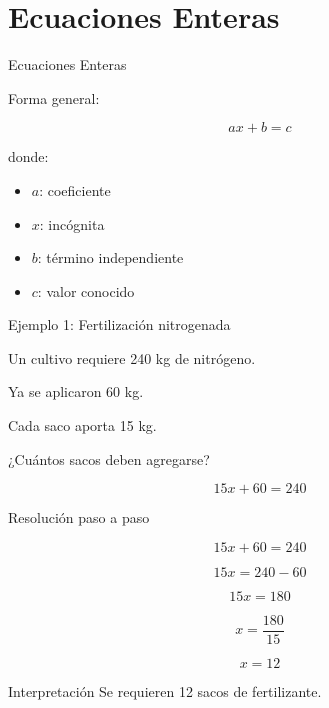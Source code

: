 \documentclass[aspectratio=169]{beamer}
\begin{document}
	\section{Ecuaciones Enteras}
	
	\begin{frame}{Ecuaciones Enteras}
		
		Forma general:
		
		\[
		ax+b=c
		\]
		
		donde:
		
		\begin{itemize}
			\item \(a\): coeficiente
			\item \(x\): incógnita
			\item \(b\): término independiente
			\item \(c\): valor conocido
		\end{itemize}
		
	\end{frame}
	
	\begin{frame}{Ejemplo 1: Fertilización nitrogenada}
		
		Un cultivo requiere 240 kg de nitrógeno.
		
		Ya se aplicaron 60 kg.
		
		Cada saco aporta 15 kg.
		
		¿Cuántos sacos deben agregarse?
		
		\[
		15x + 60 = 240
		\]
		
	\end{frame}
	
	\begin{frame}{Resolución paso a paso}
		
		\[
		15x + 60 = 240
		\]
		
		\pause
		
		\[
		15x = 240 - 60
		\]
		
		\pause
		
		\[
		15x = 180
		\]
		
		\pause
		
		\[
		x = \frac{180}{15}
		\]
		
		\pause
		
		\[
		x = 12
		\]
		
		\begin{block}{Interpretación}
			Se requieren 12 sacos de fertilizante.
		\end{block}
		
	\end{frame}
	
\end{document}

